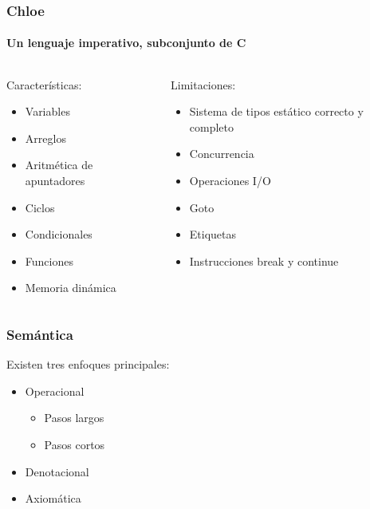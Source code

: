 \begin{frame}
\frametitle{Chloe}
\framesubtitle{Un lenguaje imperativo, subconjunto de C}

\begin{columns}[t]
\begin{block}{Características:}
\pause
\begin{itemize}
\item{Variables}
\pause
\item{Arreglos}
\pause
\item{Aritmética de apuntadores}
\pause
\item{Ciclos}
\pause
\item{Condicionales}
\pause
\item{Funciones}
\pause
\item{Memoria dinámica}
\pause
\end{itemize}
\end{block}
\begin{block}{Limitaciones:}
\begin{itemize}
\pause
\item{Sistema de tipos estático correcto y completo}
\pause
\item{Concurrencia}
\pause
\item{Operaciones I/O}
\pause
\item{Goto}
\pause
\item{Etiquetas}
\pause
\item{Instrucciones break y continue}
\end{itemize}
\pause
\end{block}
\end{columns}

\end{frame}


\begin{frame}
\frametitle{Semántica}

\pause

Existen tres enfoques principales:

\pause

\begin{itemize}
\item{Operacional}
\pause
  \begin{itemize}
    \item{Pasos largos}
    \item{Pasos cortos}
  \end{itemize}
\pause
\item{Denotacional}
\pause
\item{Axiomática}
\pause
\end{itemize}

\end{frame}

